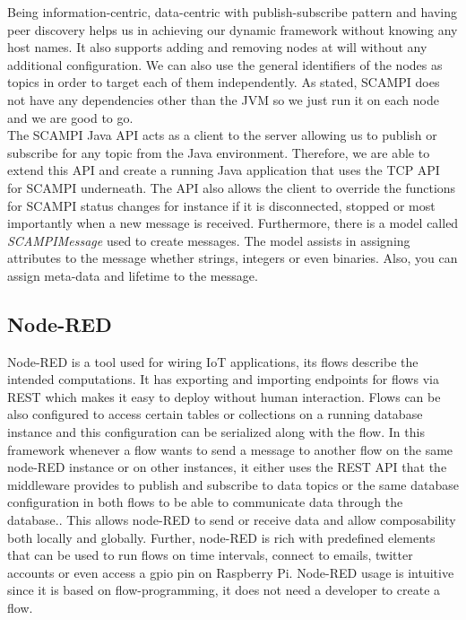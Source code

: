 \noindent Being information-centric, data-centric with publish-subscribe pattern and having peer discovery helps us in achieving our dynamic framework without knowing any host names. It  also supports adding and removing nodes at will without any additional configuration. We can also use the general identifiers of the nodes as topics in order to target each of them independently. As stated, SCAMPI does not have any dependencies other than the JVM so we just run it on each node and we are  good to go. \\


\noindent The SCAMPI Java API acts as a client to the server allowing us to publish or subscribe for any topic from the Java environment. Therefore, we are able to extend this API and create a running Java application that uses the TCP API for SCAMPI underneath. The API also allows the client to override the functions for SCAMPI status changes  for instance if it is disconnected, stopped or most importantly when a new message is received. Furthermore, there is a model called \textit{SCAMPIMessage} used to create messages. The model assists in assigning attributes to the message whether strings, integers or even binaries. Also, you can assign meta-data and lifetime to the message.


\subsection{Node-RED}

Node-RED is a tool used for wiring IoT applications, its flows describe the intended computations. It has exporting and importing endpoints for flows via REST which makes it easy to deploy without human interaction.  Flows can be also configured to access certain tables or collections on a running database instance and this configuration can be serialized along with the flow. In this framework whenever a flow wants to send a message to another flow on the same node-RED instance or on other instances, it either uses the REST API that the middleware provides to publish and subscribe to data topics or the same database configuration in both flows to be able to communicate data through the database.. This allows node-RED to send or receive data and allow composability both locally and globally.  Further, node-RED is rich with predefined elements that  can be used to run flows on time intervals, connect to emails, twitter accounts or even access a gpio pin on Raspberry Pi. Node-RED usage is intuitive since it is based on flow-programming, it does not need a developer to create a flow.

